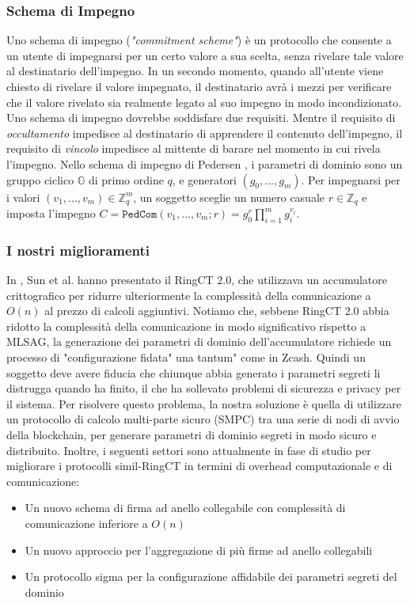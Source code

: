 \subsubsection{Schema di Impegno}
Uno schema di impegno (\emph{"commitment scheme"}) è un protocollo che consente a un utente di impegnarsi per un certo valore a sua scelta, senza rivelare tale valore al destinatario dell'impegno. In un secondo momento, quando all'utente viene chiesto di rivelare il valore impegnato, il destinatario avrà i mezzi per verificare che il valore rivelato sia realmente legato al suo impegno in modo incondizionato. Uno schema di impegno dovrebbe soddisfare due requisiti. Mentre il requisito di \emph{occultamento} impedisce al destinatario di apprendere il contenuto dell'impegno,
il requisito di \emph{vincolo} impedisce al mittente di barare nel momento in cui rivela l'impegno. Nello schema di impegno di Pedersen \cite{c23}, i parametri di dominio sono un gruppo ciclico $\mathds{G}$ di primo ordine $q$, e generatori $(g_0,..., g_m)$. Per impegnarsi per i valori $(v_1,..., v_m) \in \mathds{Z}^m_q$, un soggetto sceglie un numero casuale $r \in \mathds{Z}_q$ e imposta l'impegno
$C = \texttt{PedCom}(v_1,..., v_m; r) = g^r_0\prod^m_{i=1}g^{v_i}_i$.


\subsubsection{I nostri miglioramenti}
In \cite{c31}, Sun et al. hanno presentato il RingCT 2.0, che utilizzava un accumulatore crittografico per ridurre ulteriormente la complessità della comunicazione a $O(n)$ al prezzo di calcoli aggiuntivi. Notiamo che, sebbene RingCT 2.0 abbia ridotto la complessità della comunicazione in modo significativo rispetto a MLSAG, la generazione dei parametri di dominio dell'accumulatore richiede un processo di "configurazione fidata" una tantum" come in Zcash. Quindi un soggetto deve avere fiducia che chiunque abbia generato i parametri segreti li distrugga quando ha finito, il che ha sollevato problemi di sicurezza e privacy per il sistema. Per risolvere
questo problema, la nostra soluzione è quella di utilizzare un protocollo di calcolo multi-parte sicuro (SMPC) tra una serie di nodi di avvio della blockchain, per generare parametri di dominio segreti in modo sicuro e distribuito. Inoltre, i seguenti settori sono attualmente in fase di studio per migliorare i protocolli simil-RingCT in termini di overhead computazionale e di comunicazione:

\begin{itemize}
	\item Un nuovo schema di firma ad anello collegabile con complessità di comunicazione inferiore a $O(n)$
	\item Un nuovo approccio per l'aggregazione di più firme ad anello collegabili
	\item Un protocollo sigma per la configurazione affidabile dei parametri segreti del dominio
\end{itemize}

